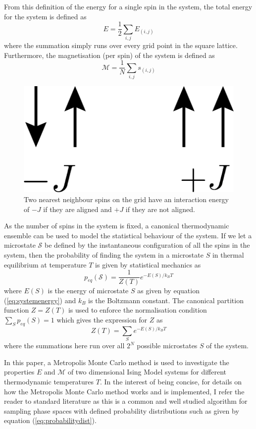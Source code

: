 \documentclass[11pt]{iopart}
\begin{document}
From this definition of the energy for a single spin in the system, the total energy for the system is defined as
\begin{equation}
\label{eq:systemenergy}
E = \frac{1}{2} \sum_{i, j} E_{(i, j)}
\end{equation}
where the summation simply runs over every grid point in the square lattice.
Furthermore, the magnetisation (per spin) of the system is defined as
\begin{equation}
\mathcal{M} = \frac{1}{N} \sum_{i, j} s_{(i, j)}
\end{equation}

\begin{figure}[t]
  \centering
  \includegraphics[width=0.2\linewidth]{images/spins/4x/spins@4x.png}
  \caption{Two nearest neighbour spins on the grid have an interaction energy of $-J$ if they are aligned and $+J$ if they are not aligned.}
  \label{fig:spinalignment}
\end{figure}

As the number of spins in the system is fixed, a canonical thermodynamic ensemble can be used to model the statistical behaviour of the system. If we let a microstate $\mathcal{S}$ be defined by the instantaneous configuration of all the spins in the system, then the probability of finding the system in a microstate $S$ in thermal equilibrium at temperature $T$ is given by statistical mechanics as \cite{statmech} \cite{handout}
\begin{equation}
\label{eq:probabilitydist}
p_{eq}(\mathcal{S}) = \frac{1}{Z(T)} e^{-E(S)/k_B T}
\end{equation}
where $E(S)$ is the energy of microstate $S$ as given by equation (\ref{eq:systemenergy}) and $k_B$ is the Boltzmann constant. The canonical partition function $Z = Z(T)$ is used to enforce the normalisation condition $\sum_S{p_{eq}(S)} = 1$ which gives the expression for $Z$ as
\begin{equation}
Z(T) = \sum_{S} e^{-E(S)/k_B T}
\end{equation}
where the summations here run over all $2^N$ possible microstates $S$ of the system.

In this paper, a Metropolis Monte Carlo method is used to investigate the properties $E$ and $\mathcal{M}$ of two dimensional Ising Model systems for different thermodynamic temperatures $T$. In the interest of being concise, for details on how the Metropolis Monte Carlo method works and is implemented, I refer the reader to standard literature \cite{montecarlo} as this is a common and well studied algorithm for sampling phase spaces with defined probability distributions such as given by equation (\ref{eq:probabilitydist}).
\end{document}
